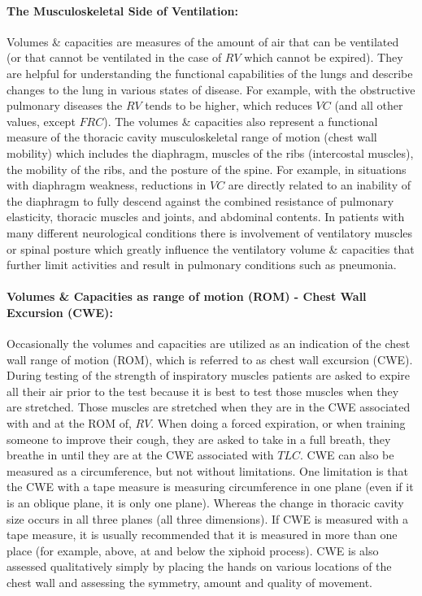 \paragraph{The Musculoskeletal Side of Ventilation:} Volumes \& capacities are measures of the amount of air that can be ventilated (or that cannot be ventilated in the case of $RV$ which cannot be expired). They are helpful for understanding the functional capabilities of the lungs and describe changes to the lung in various states of disease. For example, with the obstructive pulmonary diseases the $RV$ tends to be higher, which reduces $VC$ (and all other values, except $FRC$). The volumes \& capacities also represent a functional measure of the thoracic cavity musculoskeletal range of motion (chest wall mobility) which includes the diaphragm, muscles of the ribs (intercostal muscles), the mobility of the ribs, and the posture of the spine. For example, in situations with diaphragm weakness, reductions in $VC$ are directly related to an inability of the diaphragm to fully descend against the combined resistance of pulmonary elasticity, thoracic muscles and joints, and abdominal contents. In patients with many different neurological conditions there is involvement of ventilatory muscles or spinal posture which greatly influence the ventilatory volume \& capacities that further limit activities and result in pulmonary conditions such as pneumonia.

\paragraph{Volumes \& Capacities as range of motion (ROM) - Chest Wall Excursion (CWE):} Occasionally the volumes and capacities are utilized as an indication of the chest wall range of motion (ROM), which is referred to as chest wall excursion (CWE). During testing of the strength of inspiratory muscles patients are asked to expire all their air prior to the test because it is best to test those muscles when they are stretched. Those muscles are stretched when they are in the CWE associated with and at the ROM of, $RV$. When doing a forced expiration, or when training someone to improve their cough, they are asked to take in a full breath, they breathe in until they are at the CWE associated with $TLC$. CWE can also be measured as a circumference, but not without limitations. One limitation is that the CWE with a tape measure is measuring circumference in one plane (even if it is an oblique plane, it is only one plane). Whereas the change in thoracic cavity size occurs in all three planes (all three dimensions). If CWE is measured with a tape measure, it is usually recommended that it is measured in more than one place (for example, above, at and below the xiphoid process). CWE is also assessed qualitatively simply by placing the hands on various locations of the chest wall and assessing the symmetry, amount and quality of movement.

